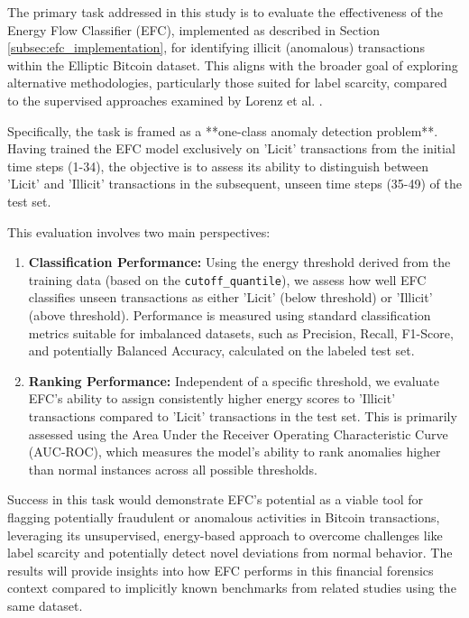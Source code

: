 \documentclass[12pt]{article}
\begin{document}
The primary task addressed in this study is to evaluate the effectiveness of the Energy Flow Classifier (EFC), implemented
as described in Section \ref{subsec:efc_implementation}, for identifying illicit (anomalous) transactions within the Elliptic
Bitcoin dataset. This aligns with the broader goal of exploring alternative methodologies, particularly those suited for
label scarcity, compared to the supervised approaches examined by Lorenz et al. \cite{lorenz2021machinelearningmethodsdetect}.

Specifically, the task is framed as a **one-class anomaly detection problem**. Having trained the EFC model exclusively
on 'Licit' transactions from the initial time steps (1-34), the objective is to assess its ability to distinguish between
'Licit' and 'Illicit' transactions in the subsequent, unseen time steps (35-49) of the test set.

This evaluation involves two main perspectives:

\begin{enumerate}
    \item \textbf{Classification Performance:} Using the energy threshold derived from the training data (based on the
      \texttt{cutoff\_quantile}), we assess how well EFC classifies unseen transactions as either 'Licit' (below threshold)
      or 'Illicit' (above threshold). Performance is measured using standard classification metrics suitable for imbalanced
      datasets, such as Precision, Recall, F1-Score, and potentially Balanced Accuracy, calculated on the labeled test set.
    \item \textbf{Ranking Performance:} Independent of a specific threshold, we evaluate EFC's ability to assign consistently
      higher energy scores to 'Illicit' transactions compared to 'Licit' transactions in the test set. This is primarily
      assessed using the Area Under the Receiver Operating Characteristic Curve (AUC-ROC), which measures the model's
      ability to rank anomalies higher than normal instances across all possible thresholds.
\end{enumerate}

Success in this task would demonstrate EFC's potential as a viable tool for flagging potentially fraudulent or anomalous
activities in Bitcoin transactions, leveraging its unsupervised, energy-based approach to overcome challenges like label
scarcity and potentially detect novel deviations from normal behavior. The results will provide insights into how EFC
performs in this financial forensics context compared to implicitly known benchmarks from related studies using the same
dataset.
\end{document}
